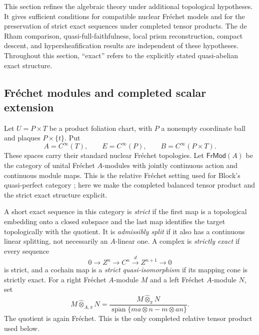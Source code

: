 \documentclass[12pt]{amsart}
\theoremstyle{definition}
\theoremstyle{remark}
\numberwithin{equation}{section}
\newcommand{\1}{{\mathbb{1}}}
\begin{document}
This section refines the algebraic theory under additional topological
hypotheses.  It gives sufficient conditions for compatible nuclear
Fr\'echet models and for the preservation of strict exact sequences
under completed tensor products.  The de Rham comparison,
quasi-full-faithfulness, local prism reconstruction, compact descent,
and hypersheafification results are independent of these hypotheses.
Throughout this section, ``exact'' refers to the explicitly stated
quasi-abelian exact structure.

\subsection{Fr\'echet modules and completed scalar extension}

Let $U=P\times T$ be a product foliation chart, with $P$ a nonempty
coordinate ball and plaques $P\times\{t\}$.  Put
\[
 A=C^\infty(T),\qquad
 E=C^\infty(P),\qquad
 B=C^\infty(P\times T).
\]
These spaces carry their standard nuclear Fr\'echet topologies.  Let
$\mathsf{FrMod}(A)$ be the category of unital Fr\'echet $A$-modules
with jointly continuous action and continuous module maps.
This is the relative Fr\'echet setting used for Block's quasi-perfect
category \cite[Section 2.2]{Blo06II}; here we make the completed
balanced tensor product and the strict exact structure explicit.

A short exact sequence in this category is \emph{strict} if the first
map is a topological embedding onto a closed subspace and the last map
identifies the target topologically with the quotient.  It is
\emph{admissibly split} if it also has a continuous linear splitting,
not necessarily an $A$-linear one.  A complex is \emph{strictly exact}
if every sequence
\[
 0\longrightarrow Z^n
 \longrightarrow C^n
 \xrightarrow{\,d\,}Z^{n+1}
 \longrightarrow0
\]
is strict, and a cochain map is a \emph{strict quasi-isomorphism} if
its mapping cone is strictly exact.  For a right Fr\'echet $A$-module
$M$ and a left Fr\'echet $A$-module $N$, set
\[
 M\mathbin{\widehat\otimes_{A,\pi}}N
 =
 \frac{M\widehat\otimes_\pi N}
 {\overline{\operatorname{span}}\{
 ma\otimes n-m\otimes an\}}.
\]
The quotient is again Fr\'echet.  This is the only completed relative
tensor product used below.
\end{document}
